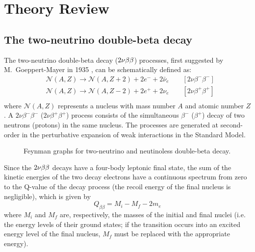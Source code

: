 \chapter{Theory Review}
\section*{The two-neutrino double-beta decay}
The two-neutrino double-beta decay ($2\nu\beta\beta$) processes, first suggested by M.~Goeppert-Mayer in 1935 \cite{PhysRev.48.512}, can be schematically defined as:
\begin{equation*}
	\begin{split}
		& \mathcal{N}(A,Z)\longrightarrow \mathcal{N}(A,Z+2)+2e^-+2\bar{\nu}_e \qquad [2\nu\beta^-\beta^-] \\
		& \mathcal{N}(A,Z)\longrightarrow \mathcal{N}(A,Z-2)+2e^++2\nu_e \qquad [2\nu\beta^+\beta^+]\\
	\end{split}
\end{equation*}
where $\mathcal{N}(A,Z)$ represents a nucleus with mass number $A$ and atomic number $Z$. A $2\nu\beta^-\beta^-$ ($2\nu\beta^+\beta^+$) process consists of the simultaneous $\beta^-$ ($\beta^+$) decay of two neutrons (protons) in the same nucleus. The processes are generated at second-order in the perturbative expansion of weak interactions in the Standard Model.
\begin{figure}
	\centering%
	\makebox[\textwidth]{%
	}%
	\caption{Feynman graphs for two-neutrino and neutinoless double-beta decay.}
	\label{fig:nbbfey}
\end{figure}

Since the $2\nu\beta\beta$ decays have a four-body leptonic final state, the sum of the kinetic energies of the two decay electrons have a continuous spectrum from zero to the Q-value of the decay process (the recoil energy of the final nucleus is negligible), which is given by
\[Q_{\beta\beta}=M_i-M_f-2m_e\]
where $M_i$ and $M_f$ are, respectively, the masses of the initial and final nuclei (i.e. the energy levels of their ground states; if the transition occurs into an excited energy level of the final nucleus, $M_f$ must be replaced with the appropriate energy). 

